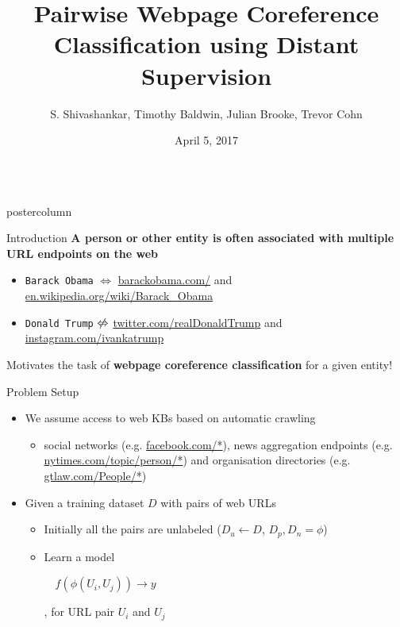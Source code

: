 \documentclass{beamer}
\title{\huge Pairwise Webpage Coreference Classification using Distant Supervision}
\author{S. Shivashankar, Timothy Baldwin, Julian Brooke, Trevor Cohn}
\institute[The University of Melbourne]{Computing and Information Systems, The University of Melbourne, Australia}
\date{April 5, 2017}
\newlength{\columnheight}
\begin{document}
\begin{frame}
\begin{columns}
	\begin{column}{.5\textwidth}
		\begin{beamercolorbox}[center]{postercolumn}
			\begin{minipage}{.98\textwidth}  %
				\parbox[t][\columnheight]{\textwidth}{ %
					\begin{myblock}{Introduction}
						\textbf{A person or other entity is often associated with multiple URL endpoints on the web}
						\vspace{0.5em}
			               \begin{itemize}
			                \item { \color{gray} \tt Barack Obama} $\Leftrightarrow$ {\color{blue} \small \url{barackobama.com/}} and {\color{blue} \small \url{en.wikipedia.org/wiki/Barack_Obama}}
					\item { \color{gray} \tt Donald Trump} $\centernot\Leftrightarrow$ {\color{blue} \small \url{twitter.com/realDonaldTrump}} and {\color{blue}  \small \url{instagram.com/ivankatrump}}
			                \end{itemize}
	              {\color{cyan} Motivates the task of  \textbf{webpage coreference classification} for a given entity!}
    				\end{myblock}\vfill
					\begin{myblock}{Problem Setup}
						\vspace{0.5em}
	 \begin{itemize}
	\item We assume access to web KBs based on automatic crawling
	\begin{itemize}
	 \item social networks (e.g. {\color{blue} \url{facebook.com/*})}, news aggregation endpoints (e.g. {\color{blue} \url{nytimes.com/topic/person/*}}) and organisation directories (e.g.  {\color{blue} \url{gtlaw.com/People/*}})
	\end{itemize}     	
\item  Given a training dataset $D$ with pairs of web URLs 
         \begin{itemize}
\item Initially all the pairs are unlabeled ($D_{u} \leftarrow D$, $D_{p}, D_{n} = \phi$)
\item Learn a model \begin{small} $\quad f(\phi(U_{i}, U_{j})) \to y$ \end{small}, for URL pair $U_{i}$ and $U_{j}$

\end{itemize}
\end{itemize}
\end{myblock}}
\end{minipage}
\end{beamercolorbox}
\end{column}
\end{columns}
\end{frame}
\end{document}

